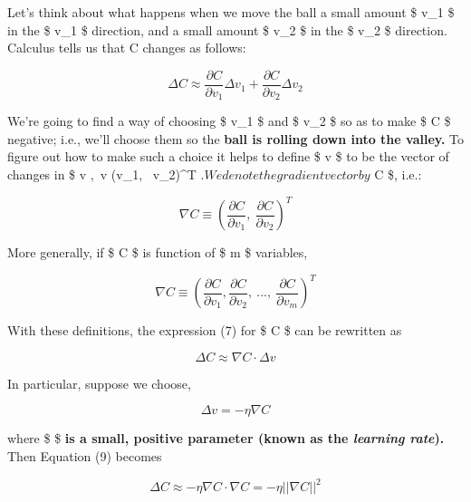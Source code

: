 \documentclass[]{article}
\begin{document}
Let's think about what happens when we move the ball a small amount \$
\Delta v\_1 \$ in the \$ v\_1 \$ direction, and a small amount \$
\Delta v\_2 \$ in the \$ v\_2 \$ direction. Calculus tells us that C
changes as follows:

\begin{equation}
    \Delta C \approx \frac {\partial C}{\partial v_1} \Delta v_1 +
    \frac{\partial C}{\partial v_2} \Delta v_2
\end{equation}

We're going to find a way of choosing \$ \Delta v\_1 \$ and \$
\Delta v\_2 \$ so as to make \$ \Delta C \$ negative; i.e., we'll choose
them so the \textbf{ball is rolling down into the valley.} To figure out
how to make such a choice it helps to define \$ \Delta v \$ to be the
vector of changes in \$ v $, $ \Delta v \equiv (\Delta v\_1,
~\Delta v\_2)\^{}T $. We denote the gradient vector by $ \nabla C \$,
i.e.:

\begin{equation}
    \nabla C \equiv \left( \frac{\partial C}{\partial v_1}, \ \frac{\partial C} 
    {\partial v_2} \right)^T
\end{equation}

More generally, if \$ C \$ is function of \$ m \$ variables,

\begin{equation}
    \nabla C \equiv \left( \frac{\partial C}{\partial v_1}, 
    \frac{\partial C}{\partial v_2}, \ ..., \ \frac{\partial C} 
    {\partial v_m} \right)^T
\end{equation}

With these definitions, the expression (7) for \$ \Delta C \$ can be
rewritten as

\begin{equation}
    \Delta C \approx \nabla C ⋅ \Delta v
\end{equation}

In particular, suppose we choose,

\begin{equation}
    \Delta v = −\eta \nabla C
\end{equation}

where \$ \eta \$ \textbf{is a small, positive parameter (known as the
\emph{learning rate}).} Then Equation (9) becomes

\begin{equation}
     \Delta C \approx −\eta \nabla C ⋅ \nabla C = −\eta || \nabla C|| ^ 2
\end{equation}
\end{document}
